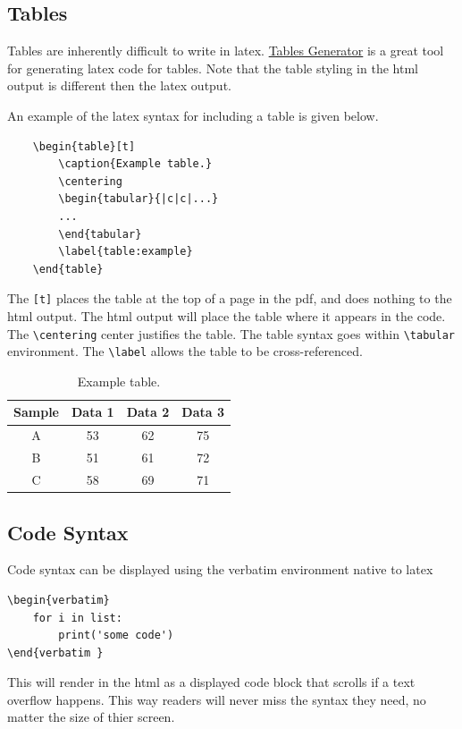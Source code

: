 \documentclass{article}
\begin{document}
\subsection{Tables}
Tables are inherently difficult to write in latex. \href{https://www.tablesgenerator.com/}{Tables Generator} is a great tool for generating latex code for tables. Note that the table styling in the html output is different then the latex output. 

An example of the latex syntax for including a table is given below.
\begin{verbatim}
    \begin{table}[t]
        \caption{Example table.}
        \centering
        \begin{tabular}{|c|c|...}
        ...
        \end{tabular}
        \label{table:example}
    \end{table}
\end{verbatim}

The \verb'[t]' places the table at the top of a page in the pdf, and does nothing to the html output. The html output will place the table where it appears in the code. The \verb'\centering' center justifies the table. The table syntax goes within \verb'\tabular' environment. The \verb'\label' allows the table to be cross-referenced. 

\begin{table}[t]
    \caption{Example table.}
    \centering
    \begin{tabular}{|c|c|c|c|}
    \hline
    \multicolumn{1}{|l|}{Sample} & \multicolumn{1}{l|}{Data 1} & \multicolumn{1}{l|}{Data  2} & \multicolumn{1}{l|}{Data 3} \\ \hline
    A                            & 53                          & 62                           & 75                          \\ \hline
    B                            & 51                          & 61                           & 72                          \\ \hline
    C                            & 58                          & 69                           & 71                          \\ \hline
    \end{tabular}
    \label{table:example}
\end{table}

\subsection{Code Syntax}
Code syntax can be displayed using the verbatim environment native to latex 
\begin{verbatim}
\begin{verbatim}
    for i in list:
        print('some code')
\end{verbatim } 
\end{verbatim}
This will render in the html as a displayed code block that scrolls if a text overflow happens. This way readers will never miss the syntax they need, no matter the size of thier screen.
\end{document}
